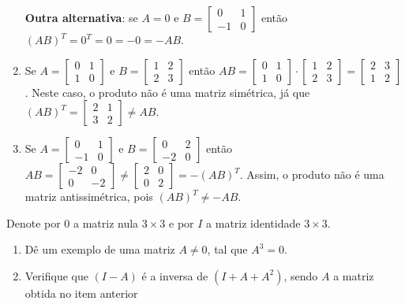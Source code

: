 \documentclass[12pt,a4paper]{article}
\begin{document}
\begin{ExerciseList}
\begin{enumerate}
\textbf{Outra alternativa}: se $A = 0$ e $B = \begin{bmatrix}
0 & 1 \\
-1 & 0
\end{bmatrix}$ então $(AB)^T = 0^T = 0 = -0 = -AB$.

\item Se $A = \begin{bmatrix}
0 & 1 \\
1 & 0
\end{bmatrix}$ e $B = \begin{bmatrix}
1 & 2 \\
2 & 3
\end{bmatrix}$ então $AB
= \begin{bmatrix}
0 & 1 \\
1 & 0
\end{bmatrix}
\cdot
\begin{bmatrix}
1 & 2 \\
2 & 3
\end{bmatrix}
=
\begin{bmatrix}
2 & 3 \\
1 & 2
\end{bmatrix}$. Neste caso, o produto não é uma matriz simétrica, já que $(AB)^T
=\begin{bmatrix}
2 & 1 \\
3 & 2
\end{bmatrix}
\neq AB$.
\item Se $A = \begin{bmatrix}
0 & 1 \\
-1 & 0
\end{bmatrix}$ e $B = \begin{bmatrix}
0 & 2 \\
-2 & 0
\end{bmatrix}$ então $AB
= \begin{bmatrix}
-2 & 0 \\
0 & -2
\end{bmatrix}
\neq \begin{bmatrix}
2 & 0 \\
0 & 2
\end{bmatrix}
= -(AB)^T$. Assim, o produto não é uma matriz antissimétrica, pois $(AB)^T \neq -AB$.
\end{enumerate}


\Exercise[title={1,8}] Denote por $0$ a matriz nula $3 \times 3$ e por $I$ a matriz identidade $3 \times 3$.
\begin{enumerate}
\item Dê um exemplo de uma matriz $A \neq 0$, tal que $A^3 = 0$.
\item Verifique que $(I-A)$ é a inversa de $(I + A + A^2)$, sendo $A$ a matriz obtida no item anterior
\end{enumerate}


\end{ExerciseList}
\end{document}
